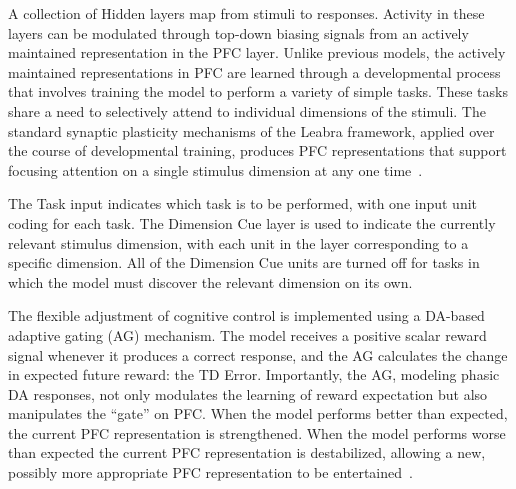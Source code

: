 A collection of Hidden layers map from stimuli to responses. Activity in these layers can be modulated through top-down biasing signals from an actively maintained representation in the PFC layer. Unlike previous models, the actively maintained representations in PFC are learned through a developmental process that involves training the model to perform a variety of simple tasks. These tasks share a need to selectively attend to individual dimensions of the stimuli. The standard synaptic plasticity mechanisms of the Leabra framework, applied over the course of developmental training, produces PFC representations that support focusing attention on a single stimulus dimension at any one time~\cite{RougierNP:2005:XT}.

The Task input indicates which task is to be performed, with one input unit coding for each task. The Dimension Cue layer is used to indicate the currently relevant stimulus dimension, with each unit in the layer corresponding to a specific dimension. All of the Dimension Cue units are turned off for tasks in which the model must discover the relevant dimension on its own.

The flexible adjustment of cognitive control is implemented using a DA-based adaptive gating (AG) mechanism. The model receives a positive scalar reward signal whenever it produces a correct response, and the AG calculates the change in expected future reward: the TD Error. Importantly, the AG, modeling phasic DA responses, not only modulates the learning of reward expectation but also manipulates the ``gate'' on PFC. When the model performs better than expected, the current PFC representation is strengthened. When the model performs worse than expected the current PFC representation is destabilized, allowing a new, possibly more appropriate PFC representation to be entertained~\cite{RougierNP:2005:XT}.



